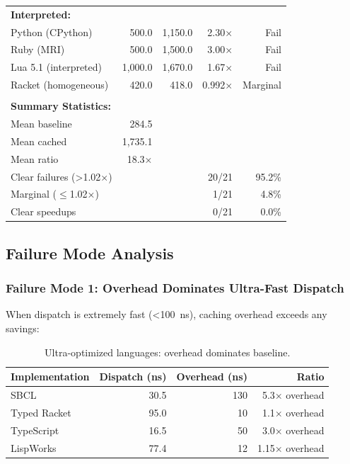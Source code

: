 \documentclass[sigplan,final]{acmart}
\begin{document}
\begin{table}[t!]
\begin{tabular}{@{}lrrrr@{}}
\\
\textbf{Interpreted:} \\
Python (CPython) & 500.0 & 1,150.0 & 2.30× & Fail \\
Ruby (MRI) & 500.0 & 1,500.0 & 3.00× & Fail \\
Lua 5.1 (interpreted) & 1,000.0 & 1,670.0 & 1.67× & Fail \\
Racket (homogeneous) & 420.0 & 418.0 & 0.992× & Marginal \\
\\
\midrule
\textbf{Summary Statistics:} & & & & \\
Mean baseline & 284.5 & & & \\
Mean cached & 1,735.1 & & & \\
Mean ratio & 18.3× & & & \\
Clear failures (>1.02×) & & & 20/21 & 95.2\% \\
Marginal ($\leq$1.02×) & & & 1/21 & 4.8\% \\
Clear speedups & & & 0/21 & 0.0\% \\
\bottomrule
\end{tabular}
\end{table}

\subsection{Failure Mode Analysis}

\subsubsection{Failure Mode 1: Overhead Dominates Ultra-Fast Dispatch}

When dispatch is extremely fast (<100~ns), caching overhead exceeds any savings:

\begin{table}[h]
\centering
\caption{Ultra-optimized languages: overhead dominates baseline.}
\label{tab:mode1}
\begin{tabular}{@{}lrrr@{}}
\toprule
\textbf{Implementation} & \textbf{Dispatch (ns)} & \textbf{Overhead (ns)} & \textbf{Ratio} \\
\midrule
SBCL & 30.5 & 130 & 5.3× overhead \\
Typed Racket & 95.0 & 10 & 1.1× overhead \\
TypeScript & 16.5 & 50 & 3.0× overhead \\
LispWorks & 77.4 & 12 & 1.15× overhead \\
\bottomrule
\end{tabular}
\end{table}
\end{document}
